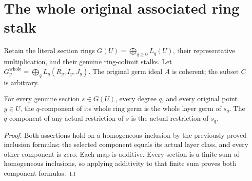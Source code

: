 \section{The whole original associated ring stalk}

Retain the literal section rings $G(U)=\bigoplus_{q\geq0}L_q(U)$,
their representative multiplication, and their genuine ring-colimit
stalks. Let $G_y^{\mathrm{whole}}=\bigoplus_q L_q(R_y,I_y,J_y)$.
The original germ ideal $A$ is coherent; the subset $C$ is arbitrary.

\begin{lemma}
\label{hir:real-domain-actual-normal-associated-ring-components}
\leanok
For every genuine section $s\in G(U)$, every degree $q$, and every
original point $y\in U$, the $q$-component of its whole ring germ is
the whole layer germ of $s_q$. The $q$-component of any actual restriction
of $s$ is the actual restriction of $s_q$.
\end{lemma}
\begin{proof}
Both assertions hold on a homogeneous inclusion by the previously proved
inclusion formulas: the selected component equals its actual layer class,
and every other component is zero. Each map is additive. Every section
is a finite sum of homogeneous inclusions, so applying additivity to
that finite sum proves both component formulas.
\end{proof}

